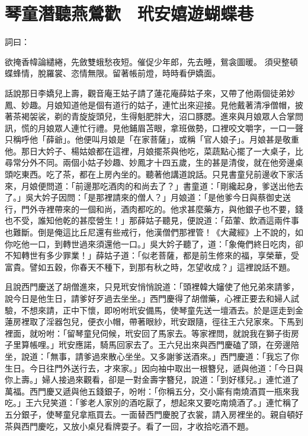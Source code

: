 %

\chapter{琴童潛聽燕鶯歡　玳安嬉遊蝴蝶巷}

詞曰：

欲掩香幃論繾綣，先斂雙蛾愁夜短。催促少年郎，先去睡，鴛衾圖暖。
須臾整頓蝶蜂情，脫羅裳、恣情無限。留著帳前燈，時時看伊嬌面。

話說那日李嬌兒上壽，觀音庵王姑子請了蓮花庵薛姑子來，又帶了他兩個徒弟妙鳳、妙趣。月娘知道他是個有道行的姑子，連忙出來迎接。見他戴著清凈僧帽，披著茶褐袈裟，剃的青旋旋頭兒，生得魁肥胖大，沼口豚腮。進來與月娘眾人合掌問訊，慌的月娘眾人連忙行禮。見他鋪眉苫眼，拿班做勢，口裡咬文嚼字，一口一聲只稱呼他「薛爺」。他便叫月娘是「在家菩薩」，或稱「官人娘子」。月娘甚是敬重他。那日大妗子、楊姑娘都在這裡，月娘擺茶與他吃，菜蔬點心擺了一大桌子，比尋常分外不同。兩個小姑子妙趣、妙鳳才十四五歲，生的甚是清俊，就在他旁邊桌頭吃東西。吃了茶，都在上房內坐的。聽著他講道說話。只見書童兒前邊收下家活來，月娘便問道：「前邊那吃酒肉的和尚去了？」書童道：「剛纔起身，爹送出他去了。」吳大妗子因問：「是那裡請來的僧人？」月娘道：「是他爹今日與蔡御史送行，門外寺裡帶來的一個和尚，酒肉都吃的。他求甚麼藥方，與他銀子也不要，錢也不受，誰知他乾的甚麼營生！」那薛姑子聽見，便說道：「茹葷、飲酒這兩件事也難斷。倒是俺這比丘尼還有些戒行，他漢僧們那裡管！《大藏經》上不說的，如你吃他一口，到轉世過來須還他一口。」吳大妗子聽了，道：「象俺們終日吃肉，卻不知轉世有多少罪業！」薛姑子道：「似老菩薩，都是前生修來的福，享榮華，受富貴。譬如五穀，你春天不種下，到那有秋之時，怎望收成？」這裡說話不題。

且說西門慶送了胡僧進來，只見玳安悄悄說道：「頭裡韓大嬸使了他兄弟來請爹，說今日是他生日，請爹好歹過去坐坐。」西門慶得了胡僧藥，心裡正要去和婦人試驗，不想來請，正中下懷，即吩咐玳安備馬，使琴童先送一壇酒去。於是逕走到金蓮房裡取了淫器包兒，便衣小帽，帶著眼紗，玳安跟隨，徑往王六兒家來。下馬到裡面，就吩咐：「留琴童兒伺候，玳安回了馬家去。等家裡問，就說我在獅子街房子里算帳哩。」玳安應諾，騎馬回家去了。王六兒出來與西門慶磕了頭，在旁邊陪坐，說道：「無事，請爹過來散心坐坐。又多謝爹送酒來。」西門慶道：「我忘了你生日。今日往門外送行去，才來家。」因向袖中取出一根簪兒，遞與他道：「今日與你上壽。」婦人接過來觀看，卻是一對金壽字簪兒，說道：「到好樣兒。」連忙道了萬福。西門慶又遞與他五錢銀子，吩咐：「你稱五分，交小廝有南燒酒買一瓶來我吃。」王六兒笑道：「爹老人家別的酒吃厭了，想起來又要吃南燒酒了。」連忙稱了五分銀子，使琴童兒拿瓶買去。一面替西門慶脫了衣裳，請入房裡坐的。親自頓好茶與西門慶吃，又放小桌兒看牌耍子。看了一回，才收拾吃酒不題。

